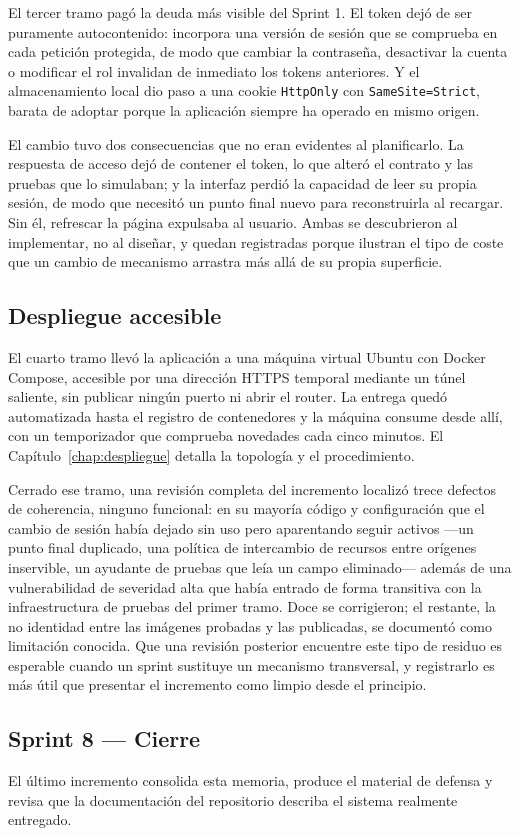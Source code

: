 El tercer tramo pagó la deuda más visible del Sprint 1. El token dejó de ser puramente autocontenido: incorpora una versión de sesión que se comprueba en cada petición protegida, de modo que cambiar la contraseña, desactivar la cuenta o modificar el rol invalidan de inmediato los tokens anteriores. Y el almacenamiento local dio paso a una cookie \texttt{HttpOnly} con \texttt{SameSite=Strict}, barata de adoptar porque la aplicación siempre ha operado en mismo origen.

El cambio tuvo dos consecuencias que no eran evidentes al planificarlo. La respuesta de acceso dejó de contener el token, lo que alteró el contrato y las pruebas que lo simulaban; y la interfaz perdió la capacidad de leer su propia sesión, de modo que necesitó un punto final nuevo para reconstruirla al recargar. Sin él, refrescar la página expulsaba al usuario. Ambas se descubrieron al implementar, no al diseñar, y quedan registradas porque ilustran el tipo de coste que un cambio de mecanismo arrastra más allá de su propia superficie.

\subsection*{Despliegue accesible}

El cuarto tramo llevó la aplicación a una máquina virtual Ubuntu con Docker Compose, accesible por una dirección HTTPS temporal mediante un túnel saliente, sin publicar ningún puerto ni abrir el router. La entrega quedó automatizada hasta el registro de contenedores y la máquina consume desde allí, con un temporizador que comprueba novedades cada cinco minutos. El Capítulo~\ref{chap:despliegue} detalla la topología y el procedimiento.

Cerrado ese tramo, una revisión completa del incremento localizó trece defectos de coherencia, ninguno funcional: en su mayoría código y configuración que el cambio de sesión había dejado sin uso pero aparentando seguir activos ---un punto final duplicado, una política de intercambio de recursos entre orígenes inservible, un ayudante de pruebas que leía un campo eliminado--- además de una vulnerabilidad de severidad alta que había entrado de forma transitiva con la infraestructura de pruebas del primer tramo. Doce se corrigieron; el restante, la no identidad entre las imágenes probadas y las publicadas, se documentó como limitación conocida. Que una revisión posterior encuentre este tipo de residuo es esperable cuando un sprint sustituye un mecanismo transversal, y registrarlo es más útil que presentar el incremento como limpio desde el principio.

\subsection*{Sprint 8 --- Cierre}

El último incremento consolida esta memoria, produce el material de defensa y revisa que la documentación del repositorio describa el sistema realmente entregado.
